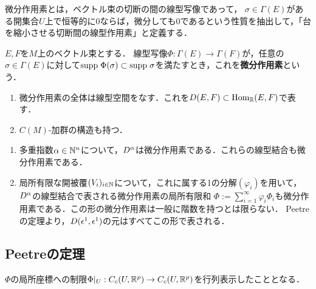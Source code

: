 \documentclass[uplatex,dvipdfmx]{jsreport}
\begin{document}
\begin{tcolorbox}[colframe=ForestGreen, colback=ForestGreen!10!white,breakable,colbacktitle=ForestGreen!40!white,coltitle=black,fonttitle=\bfseries\sffamily,
    title=]
    微分作用素とは，ベクトル束の切断の間の線型写像であって，
    $\sigma\in\Gamma(E)$がある開集合$U$上で恒等的に$0$ならば，微分しても$0$であるという性質を抽出して，「台を縮小させる切断間の線型作用素」と定義する．
\end{tcolorbox}

\begin{definition}
    $E,F$を$M$上のベクトル束とする．
    線型写像$\Phi:\Gamma(E)\to\Gamma(F)$が，任意の$\sigma\in\Gamma(E)$に対して$\mathrm{supp}\;\Phi(\sigma)\subset\mathrm{supp}\;\sigma$を満たすとき，これを\textbf{微分作用素}という．
\end{definition}

\begin{lemma}\mbox{}
    \begin{enumerate}
        \item 微分作用素の全体は線型空間をなす．これを$D(E,F)\subset\mathrm{Hom}_{\mathbb{R}}(E,F)$で表す．
        \item $C(M)$-加群の構造も持つ．
    \end{enumerate}
\end{lemma}

\begin{example}\mbox{}
    \begin{enumerate}
        \item 多重指数$\alpha\in\mathbb{N}^n$について，$D^\alpha$は微分作用素である．これらの線型結合も微分作用素である．
        \item 局所有限な開被覆$(V_i)_{i\in\mathbb{N}}$について，これに属する1の分解$(\varphi_i)$を用いて，$D^\alpha$の線型結合で表される微分作用素の局所有限和
        $\Phi:=\sum^\infty_{i=1}\varphi_i\Phi_i$も微分作用素である．この形の微分作用素は一般に階数を持つとは限らない．
        Peetreの定理より，$D(\epsilon^1,\epsilon^1)$の元はすべてこの形で表される．
    \end{enumerate}
\end{example}

\subsection{Peetreの定理}

\begin{tcolorbox}[colframe=ForestGreen, colback=ForestGreen!10!white,breakable,colbacktitle=ForestGreen!40!white,coltitle=black,fonttitle=\bfseries\sffamily,
title=]
    $\Phi$の局所座標への制限$\Phi|_U:C_c(U,\mathbb{R}^p)\to C_c(U,\mathbb{R}^p)$を行列表示したこととなる．
\end{tcolorbox}
\end{document}
